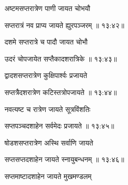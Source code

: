 {\devanagarifont अष्टमसप्तरात्रेण पाणी जायत चोभयौ \thinspace{\dandab} \dontdisplaylinenum }%


{\devanagarifont सप्तरात्रं नव प्राप्य जायते ह्युरपञ्जरम् {॥ १३:४२॥} \veg\dontdisplaylinenum }%

{\devanagarifont दशमे सप्तरात्रे च पादौ जायत चोभौ \thinspace{\dandab} \dontdisplaylinenum }%


{\devanagarifont उदरं चोपजायेत सप्तैकादशरात्रिके {॥ १३:४३॥} \veg\dontdisplaylinenum }%

{\devanagarifont द्वादशसप्तरात्रेण कुक्षिपार्श्वः प्रजायते \thinspace{\dandab} \dontdisplaylinenum }%


{\devanagarifont सप्तत्रैदशरात्रेण कटिस्तत्रोपजायते {॥ १३:४४॥} \veg\dontdisplaylinenum }%

{\devanagarifont नवत्यष्ट च रात्रेण जायते सूत्रविंशतिः \thinspace{\dandab} \dontdisplaylinenum }%


{\devanagarifont सप्तपञ्चदशाहेन सर्वमेदः प्रजायते {॥ १३:४५॥} \veg\dontdisplaylinenum }%
 
{\devanagarifont षोडशसप्तरात्रेण अस्थि सर्वाणि जायते \thinspace{\dandab} \dontdisplaylinenum }%
 

{\devanagarifont सप्तसप्तदशाहेन जायते स्नायुबन्धनम् {॥ १३:४६॥} \veg\dontdisplaylinenum }%
 
{\devanagarifont सप्तमाष्टादशाहेन जायते मुखमण्डलम् \thinspace{\dandab} \dontdisplaylinenum }%
 
